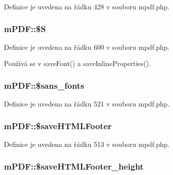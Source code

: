 Definice je uvedena na řádku 428 v souboru mpdf.\-php.

\hypertarget{classm_p_d_f_a5ef41180a681be3552e256687dcc7557}{
\subsubsection[{\$\-S}]{\setlength{\rightskip}{0pt plus 5cm}m\-P\-D\-F\-::\$\-S}}\label{classm_p_d_f_a5ef41180a681be3552e256687dcc7557}


Definice je uvedena na řádku 600 v souboru mpdf.\-php.



Používá se v save\-Font() a save\-Inline\-Properties().

\hypertarget{classm_p_d_f_ad84d66f570dc7f9bf5a9faf76c5b5762}{
\subsubsection[{\$sans\-\_\-fonts}]{\setlength{\rightskip}{0pt plus 5cm}m\-P\-D\-F\-::\$sans\-\_\-fonts}}\label{classm_p_d_f_ad84d66f570dc7f9bf5a9faf76c5b5762}


Definice je uvedena na řádku 521 v souboru mpdf.\-php.

\hypertarget{classm_p_d_f_af072919ba19adb69564abc1175ee6567}{
\subsubsection[{\$save\-H\-T\-M\-L\-Footer}]{\setlength{\rightskip}{0pt plus 5cm}m\-P\-D\-F\-::\$save\-H\-T\-M\-L\-Footer}}\label{classm_p_d_f_af072919ba19adb69564abc1175ee6567}


Definice je uvedena na řádku 513 v souboru mpdf.\-php.

\hypertarget{classm_p_d_f_ab14094685a53a13f25702ed722d2a544}{
\subsubsection[{\$save\-H\-T\-M\-L\-Footer\-\_\-height}]{\setlength{\rightskip}{0pt plus 5cm}m\-P\-D\-F\-::\$save\-H\-T\-M\-L\-Footer\-\_\-height}}\label{classm_p_d_f_ab14094685a53a13f25702ed722d2a544}


